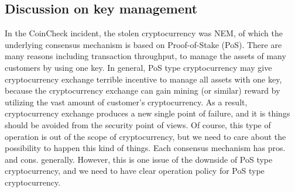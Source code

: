 \subsection{Discussion on key management}

In the CoinCheck incident, the stolen cryptocurrency was NEM, of which the underlying consensus mechanism is based on Proof-of-Stake (PoS).
There are many reasons including transaction throughput, to manage the assets of many customers by using one key.
In general, PoS type cryptocurrency may
give cryptocurrency exchange terrible incentive to manage all assets with one key, because the cryptocurrency exchange can gain mining (or similar) reward by utilizing the vast amount of customer's cryptocurrency.  As a result, cryptocurrency exchange produces a new single point of failure, and it is
things should be avoided from the security point of views. Of course, this type of operation is out of the scope of cryptocurrency, but we need to care about the possibility to
happen this kind of things.
Each consensus mechanism has pros. and cons. generally. However, this is one issue of the downside of PoS type cryptocurrency, and we need to have
clear operation policy for PoS type cryptocurrency.
